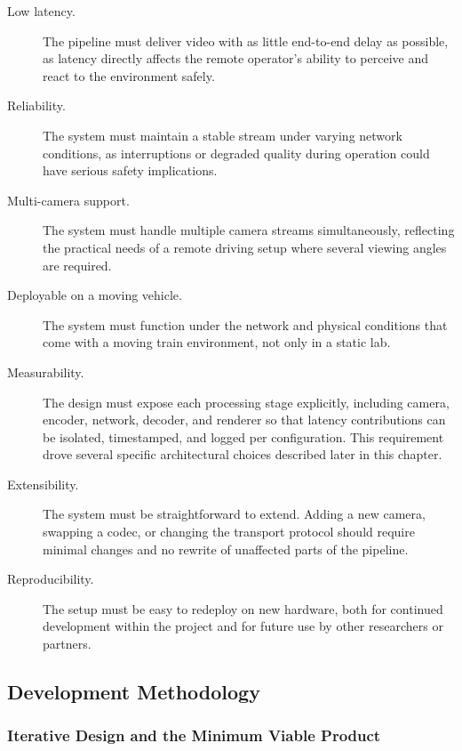 \begin{description}
  \item[Low latency.] The pipeline must deliver video with as little end-to-end delay as possible, as latency directly affects the remote operator's ability to perceive and react to the environment safely.

  \item[Reliability.] The system must maintain a stable stream under varying network conditions, as interruptions or degraded quality during operation could have serious safety implications.

  \item[Multi-camera support.] The system must handle multiple camera streams simultaneously, reflecting the practical needs of a remote driving setup where several viewing angles are required.

  \item[Deployable on a moving vehicle.] The system must function under the network and physical conditions that come with a moving train environment, not only in a static lab.

  \item[Measurability.] The design must expose each processing stage explicitly, including camera, encoder, network, decoder, and renderer so that latency contributions can be isolated, timestamped, and logged per configuration. This requirement drove several specific architectural choices described later in this chapter.

  \item[Extensibility.] The system must be straightforward to extend. Adding a new camera, swapping a codec, or changing the transport protocol should require minimal changes and no rewrite of unaffected parts of the pipeline.

  \item[Reproducibility.] The setup must be easy to redeploy on new hardware, both for continued development within the project and for future use by other researchers or partners.
\end{description}

\subsection{Development Methodology}

\subsubsection{Iterative Design and the Minimum Viable Product}

